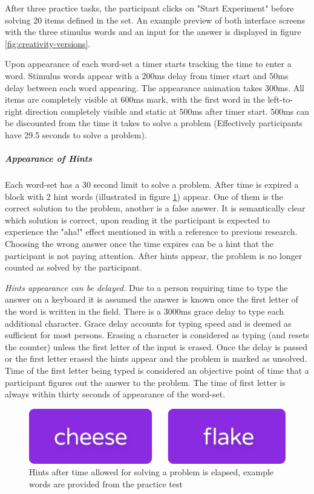 		After three practice tasks, the participant clicks on "Start Experiment" before solving 20 items defined in the set. An example preview of both interface screens with the three stimulus words and an input for the answer is displayed in figure \ref{fig:creativity-versions}.
		
		Upon appearance of each word-set a timer starts tracking the time to enter a word.
		Stimulus words appear with a 200ms delay from timer start and 50ms delay between each word appearing. The appearance animation takes 300ms. All items are completely visible at 600ms mark, with the first word in the left-to-right direction completely visible and static at 500ms after timer start. 500ms can be discounted from the time it takes to solve a problem (Effectively participants have 29.5 seconds to solve a problem).
		
		\subparagraph{Appearance of Hints}
		
		Each word-set has a 30 second limit to solve a problem. After time is expired a block with 2 hint words (illustrated in figure \ref{fig:hint-buttons}) appear. One of them is the correct solution to the problem, another is a false answer. It is semantically clear which solution is correct, upon reading it the participant is expected to experience the "aha!" effect mentioned in \cite[p.634]{Bowden} with a reference to previous research. Choosing the wrong answer once the time expires can be a hint that the participant is not paying attention. After hints appear, the problem is no longer counted as solved by the participant.
		
		\textit{Hints appearance can be delayed.} Due to a person requiring time to type the answer on a keyboard it is assumed the answer is known once the first letter of the word is written in the field. There is a 3000ms grace delay to type each additional character. Grace delay accounts for typing speed and is deemed as sufficient for most persons. Erasing a character is considered as typing (and resets the counter) unless the first letter of the input is erased. Once the delay is passed or the first letter erased the hints appear and the problem is marked as unsolved. Time of the first letter being typed is considered an objective point of time that a participant figures out the answer to the problem. The time of first letter is always within thirty seconds of appearance of the word-set.
		
		\begin{figure}
			\centering
			\includegraphics[width=0.3\linewidth]{graphics/Hint-buttons}
			\caption{Hints after time allowed for solving a problem is elapsed, example words are provided from the practice test}
			\label{fig:hint-buttons}
		\end{figure}
		
